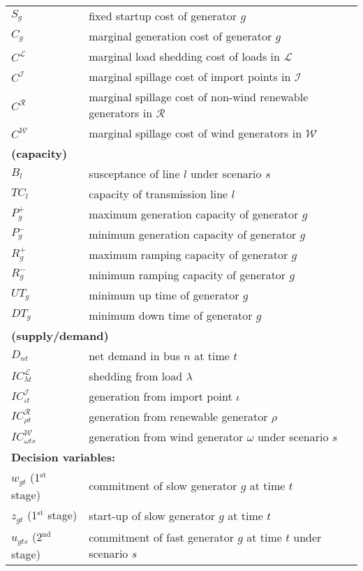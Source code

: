 \begin{table}[H]
\begin{tabular}{ll}
		$S_g$ & fixed startup cost of generator $g$\\
		$C_g$ & marginal generation cost of generator $g$	\\
		$C^\mathcal{L}$ & marginal load shedding cost of loads in $\mathcal{L}$	\\
		$C^\mathcal{I}$ & marginal spillage cost of import points in $\mathcal{I}$ \\
		$C^\mathcal{R}$ & marginal spillage cost of non-wind  renewable generators in $\mathcal{R}$ \\ 
		$C^\mathcal{W}$ & marginal spillage cost of wind generators in $\mathcal{W}$ \\
		\multicolumn{2}{l}{\textbf{(capacity)}} \\
		$B_{l}$ & susceptance of line $l$ under scenario $s$\\
		$TC_l$ & capacity of transmission line $l$\\
		$P_{g}^+$ & maximum generation capacity of generator $g$\\
		$P_{g}^-$ & minimum generation capacity of generator $g$ \\
		$R_{g}^+$ & maximum ramping capacity of generator $g$\\
		$R_{g}^-$ & minimum ramping capacity of generator $g$\\
		$UT_{g}$ & minimum up time of generator $g$\\
		$DT_{g}$ & minimum down time of generator $g$\\
		\multicolumn{2}{l}{\textbf{(supply/demand)}} \\
		$D_{nt}$ & net demand in bus $n$ at time $t$ \\
		$IC_{\lambda t}^\mathcal{L}$ & shedding from load $\lambda$\\
		$IC_{\iota t}^\mathcal{I}$ & generation from import point $\iota$\\
		$IC_{\rho t}^\mathcal{R}$ & generation from renewable generator $\rho$\\
		$IC_{\omega ts}^\mathcal{W}$ & generation from wind generator $\omega$ under scenario $s$\\ \midrule
		\multicolumn{2}{l}{\textbf{Decision variables:}} \\
		$w_{gt}$ (1$^{\textrm{st}}$ stage) 	& commitment of slow generator $g$ at time $t$\\
		$z_{gt}$ (1$^{\textrm{st}}$ stage)	&	start-up of slow generator $g$ at time $t$\\
		$u_{gts}$ (2$^{\textrm{nd}}$ stage)	&	commitment of fast generator $g$ at time $t$ under scenario $s$\\

\end{tabular}
\end{table}

